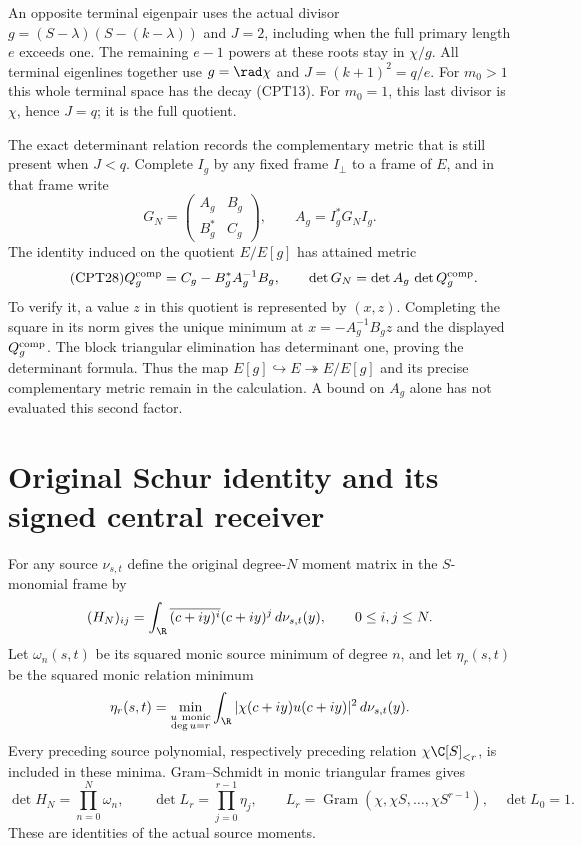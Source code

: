 An opposite terminal eigenpair uses the actual divisor
\(g=(S-\lambda)(S-(k-\lambda))\) and \(J=2\), including when
the full primary length \(e\) exceeds one.  The remaining
\(e-1\) powers at these roots stay in \(\chi/g\).
All terminal eigenlines together use \(g=\rad\chi\) and
\(J=(k+1)^2=q/e\).  For \(m_0>1\) this whole terminal space
has the decay (CPT13).  For \(m_0=1\), this last divisor is
\(\chi\), hence \(J=q\); it is the full quotient.

The exact determinant relation records the complementary metric
that is still present when \(J<q\).  Complete \(I_g\) by any fixed
frame \(I_\perp\) to a frame of \(E\), and in that frame write
\[
 G_N=\begin{pmatrix} A_g&B_g\\B_g^*&C_g\end{pmatrix},
 \qquad A_g=I_g^*G_NI_g.
\]
The identity induced on the quotient \(E/E[g]\) has attained
metric
\begin{equation}\tag{CPT28}
 Q_g^{\rm comp}=C_g-B_g^*A_g^{-1}B_g,\qquad
 \det G_N=\det A_g\,\det Q_g^{\rm comp}.
\end{equation}
To verify it, a value \(z\) in this quotient is represented by
\((x,z)\).  Completing the square in its norm gives the unique
minimum at \(x=-A_g^{-1}B_gz\) and the displayed \(Q_g^{\rm comp}\).
The block triangular elimination has determinant one, proving
the determinant formula.  Thus the map \(E[g]\hookrightarrow
E\twoheadrightarrow E/E[g]\) and its precise complementary
metric remain in the calculation.  A bound on \(A_g\) alone
has not evaluated this second factor.

\section{Original Schur identity and its signed central receiver}
\label{cpt:sec:determinants}

For any source \(\nu_{s,t}\) define the original degree-\(N\)
moment matrix in the \(S\)-monomial frame by
\[
 (H_N)_{ij}=\int_\R
       \overline{(c+iy)^i}(c+iy)^j\,d\nu_{s,t}(y),
 \qquad 0\le i,j\le N.
\]
Let \(\omega_n(s,t)\) be its squared monic source minimum of
degree \(n\), and let \(\eta_r(s,t)\) be the squared monic
relation minimum
\[
 \eta_r(s,t)=
 \min_{\substack{u\ {\rm monic}\\\deg u=r}}
 \int_\R|\chi(c+iy)u(c+iy)|^2\,d\nu_{s,t}(y).
\]
Every preceding source polynomial, respectively preceding
relation \(\chi\C[S]_{<r}\), is included in these minima.
Gram--Schmidt in monic triangular frames gives
\[
 \det H_N=\prod_{n=0}^N\omega_n,\qquad
 \det L_r=\prod_{j=0}^{r-1}\eta_j,
 \qquad
 L_r=\operatorname{Gram}(\chi,\chi S,\ldots,\chi S^{r-1}),
 \quad \det L_0=1.
\]
These are identities of the actual source moments.

